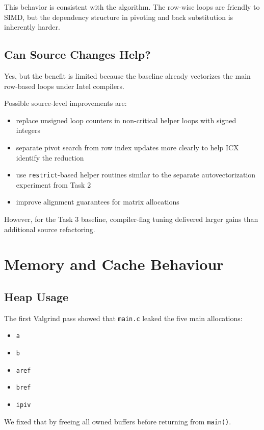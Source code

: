 \documentclass[11pt,a4paper]{article}
\begin{document}
This behavior is consistent with the algorithm. The row-wise loops are friendly
to SIMD, but the dependency structure in pivoting and back substitution is
inherently harder.

\subsection{Can Source Changes Help?}

Yes, but the benefit is limited because the baseline already vectorizes the
main row-based loops under Intel compilers.

Possible source-level improvements are:

\begin{itemize}
\item replace unsigned loop counters in non-critical helper loops with signed integers
\item separate pivot search from row index updates more clearly to help ICX identify the reduction
\item use \texttt{restrict}-based helper routines similar to the separate autovectorization experiment from Task 2
\item improve alignment guarantees for matrix allocations
\end{itemize}

However, for the Task 3 baseline, compiler-flag tuning delivered larger gains
than additional source refactoring.

\section{Memory and Cache Behaviour}

\subsection{Heap Usage}

The first Valgrind pass showed that \texttt{main.c} leaked the five main
allocations:

\begin{itemize}
\item \texttt{a}
\item \texttt{b}
\item \texttt{aref}
\item \texttt{bref}
\item \texttt{ipiv}
\end{itemize}

We fixed that by freeing all owned buffers before returning from \texttt{main()}.
\end{document}
